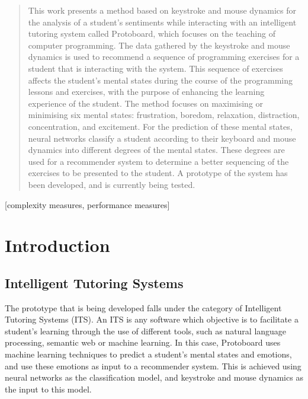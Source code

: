 \documentclass{acm_proc_article-sp}
\begin{document}
\maketitle
\begin{abstract}
This work presents a method based on keystroke and mouse dynamics for
the analysis of a student's sentiments while interacting with an
intelligent tutoring system called Protoboard, which focuses on the
teaching of computer programming. The data gathered by the keystroke
and mouse dynamics is used to recommend a sequence of programming
exercises for a student that is interacting with the system. This
sequence of exercises affects the student's mental states during
the course of the programming lessons and exercises, with the purpose
of enhancing the learning experience of the student. The method
focuses on maximising or minimising six mental states: frustration,
boredom, relaxation, distraction, concentration, and excitement. For
the prediction of these mental states, neural networks classify a
student according to their keyboard and mouse dynamics into different
degrees of the mental states. These degrees are used for a recommender
system to determine a better sequencing of the exercises to be
presented to the student. A prototype of the system has been
developed, and is currently being tested.
\end{abstract}

[complexity measures, performance measures]



\section{Introduction}

\subsection{Intelligent Tutoring Systems}
\label{ITSs}

The prototype that is being developed falls under the category of
Intelligent Tutoring Systems (ITS). An ITS is any software which
objective is to facilitate a student's learning through the use of
different tools, such as natural language processing, semantic web or
machine learning. In this case, Protoboard uses machine learning
techniques to predict a student's mental states and emotions, and use
these emotions as input to a recommender system. This is achieved
using neural networks as the classification model, and keystroke and
mouse dynamics as the input to this model.
\end{document}
